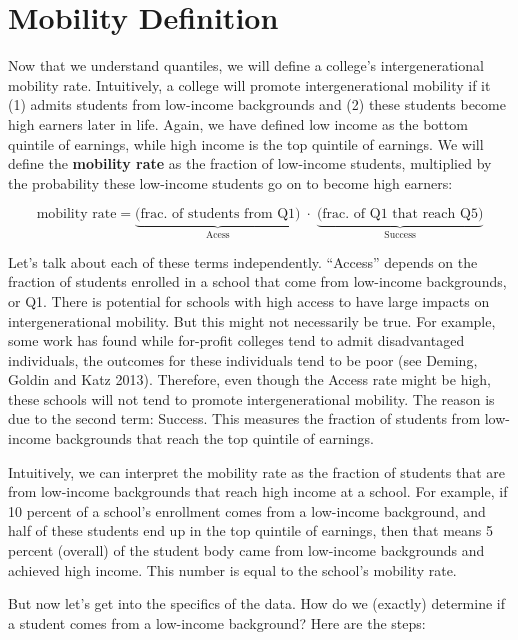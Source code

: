 \documentclass[
]{book}
\begin{document}
\section{Mobility Definition}\label{mobility-definition}

Now that we understand quantiles, we will define a college's intergenerational mobility rate. Intuitively, a college will promote intergenerational mobility if it (1) admits students from low-income backgrounds and (2) these students become high earners later in life. Again, we have defined low income as the bottom quintile of earnings, while high income is the top quintile of earnings. We will define the \textbf{mobility rate} as the fraction of low-income students, multiplied by the probability these low-income students go on to become high earners:

\[
\text{mobility rate}= \underbrace{\text{(frac. of students from Q1)}}_{\text{Acess}} \; \cdot \; \underbrace{\text{(frac. of Q1 that reach Q5)}}_{\text{Success}} \nonumber
\]

Let's talk about each of these terms independently. ``Access'' depends on the fraction of students enrolled in a school that come from low-income backgrounds, or Q1. There is potential for schools with high access to have large impacts on intergenerational mobility. But this might not necessarily be true. For example, some work has found while for-profit colleges tend to admit disadvantaged individuals, the outcomes for these individuals tend to be poor (see Deming, Goldin and Katz 2013).\citep{deming2013profit} Therefore, even though the Access rate might be high, these schools will not tend to promote intergenerational mobility. The reason is due to the second term: Success. This measures the fraction of students from low-income backgrounds that reach the top quintile of earnings.

Intuitively, we can interpret the mobility rate as the fraction of students that are from low-income backgrounds that reach high income at a school. For example, if 10 percent of a school's enrollment comes from a low-income background, and half of these students end up in the top quintile of earnings, then that means 5 percent (overall) of the student body came from low-income backgrounds and achieved high income. This number is equal to the school's mobility rate.

But now let's get into the specifics of the data. How do we (exactly) determine if a student comes from a low-income background? Here are the steps:
\end{document}

